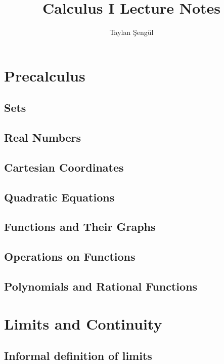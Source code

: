 \documentclass[12pt]{memoir}
\title{Calculus I Lecture Notes}
\author{Taylan Şengül}
\begin{document}
\maketitle
\tableofcontents
\chapter{Precalculus}
    \section{Sets}
    
    \section{Real Numbers}
    
    \section{Cartesian Coordinates}
    
    \section{Quadratic Equations}
    
    \section{Functions and Their Graphs}
    
    \section{Operations on Functions}
    
    \section{Polynomials and Rational Functions}
    


\chapter{Limits and Continuity}
    \section{Informal definition of limits}
    
\end{document}
